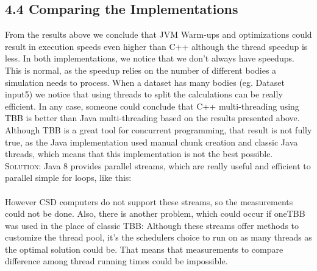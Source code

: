 \documentclass{article}
\begin{document}
\subsection*{4.4 Comparing the Implementations}
From the results above we conclude that JVM Warm-ups and optimizations could result in execution speeds even higher than C++ although the thread speedup is less.
In both implementations, we notice that we don't always have speedups. This is normal, as the speedup relies on the number of different bodies a simulation needs to process. When a dataset has many bodies (eg. Dataset input5) we notice that using threads to split the calculations can be really efficient. In any case, someone could conclude that C++ multi-threading using TBB is better than Java multi-threading based on the results presented above. Although TBB is a great tool for concurrent programming, that result is not fully true, as the Java implementation used manual chunk creation and classic Java threads, which means that this implementation is not the best possible. \\ 
\textsc{Solution:} Java 8 provides parallel streams, which are really useful and efficient to parallel simple for loops, like this: \\
\\
However CSD computers do not support these streams, so the measurements could not be done. Also, there is another problem, which could occur if oneTBB was used in the place of classic TBB: Although these streams offer methods to customize the thread pool, it's the schedulers choice to run on as many threads as the optimal solution could be. That means that measurements to compare difference among thread running times could be impossible.
\end{document}
